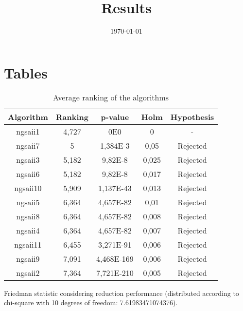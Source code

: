 \documentclass{article}
\title{Results}
\author{}
\date{\today}
\begin{document}
\oddsidemargin 0in \topmargin 0in\maketitle

\section{Tables}
\begin{table}[!htp]
\centering
\begin{tabular}{c|c|c|c|c}
Algorithm&Ranking&p-value&Holm&Hypothesis\\
\hline
ngsaii1 & 4,727 & 0E0 & 0 & -\\
ngsaii7 & 5 & 1,384E-3 & 0,05 & Rejected\\
ngsaii3 & 5,182 & 9,82E-8 & 0,025 & Rejected\\
ngsaii6 & 5,182 & 9,82E-8 & 0,017 & Rejected\\
ngsaii10 & 5,909 & 1,137E-43 & 0,013 & Rejected\\
ngsaii5 & 6,364 & 4,657E-82 & 0,01 & Rejected\\
ngsaii8 & 6,364 & 4,657E-82 & 0,008 & Rejected\\
ngsaii4 & 6,364 & 4,657E-82 & 0,007 & Rejected\\
ngsaii11 & 6,455 & 3,271E-91 & 0,006 & Rejected\\
ngsaii9 & 7,091 & 4,468E-169 & 0,006 & Rejected\\
ngsaii2 & 7,364 & 7,721E-210 & 0,005 & Rejected\\
\end{tabular}
\caption{Average ranking of the algorithms}
\end{table}


Friedman statistic considering reduction performance (distributed according to chi-square with 10 degrees of freedom: 7.61983471074376).
\end{document}
